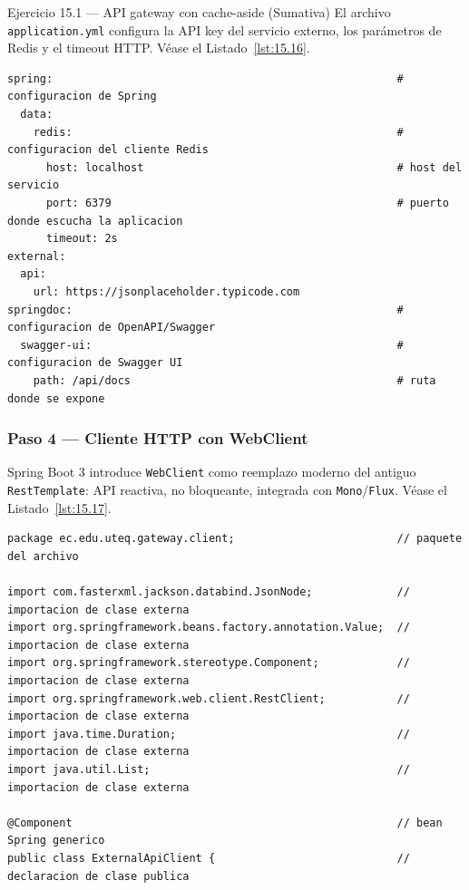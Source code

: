 \documentclass[11pt,a4paper,openany]{book}
\begin{document}
\begin{cajaejercicio}{Ejercicio 15.1 --- API gateway con cache-aside (Sumativa)}
El archivo \texttt{application.yml} configura la API key
del servicio externo, los parámetros de Redis y el timeout HTTP. V\'ease el Listado~\ref{lst:15.16}.


\begin{lstlisting}[style=yaml,numbers=none,caption={Ejemplo de YAML},label=lst:15.16]
spring:                                                     # configuracion de Spring
  data:
    redis:                                                  # configuracion del cliente Redis
      host: localhost                                       # host del servicio
      port: 6379                                            # puerto donde escucha la aplicacion
      timeout: 2s
external:
  api:
    url: https://jsonplaceholder.typicode.com
springdoc:                                                  # configuracion de OpenAPI/Swagger
  swagger-ui:                                               # configuracion de Swagger UI
    path: /api/docs                                         # ruta donde se expone
\end{lstlisting}

\subsubsection*{Paso 4 --- Cliente HTTP con WebClient}

Spring Boot 3 introduce \texttt{WebClient} como reemplazo
moderno del antiguo \texttt{RestTemplate}: API reactiva, no
bloqueante, integrada con \texttt{Mono}/\texttt{Flux}. V\'ease el Listado~\ref{lst:15.17}.


\begin{lstlisting}[style=java,caption={ExternalApiClient.java},label=lst:15.17]
package ec.edu.uteq.gateway.client;                         // paquete del archivo

import com.fasterxml.jackson.databind.JsonNode;             // importacion de clase externa
import org.springframework.beans.factory.annotation.Value;  // importacion de clase externa
import org.springframework.stereotype.Component;            // importacion de clase externa
import org.springframework.web.client.RestClient;           // importacion de clase externa
import java.time.Duration;                                  // importacion de clase externa
import java.util.List;                                      // importacion de clase externa

@Component                                                  // bean Spring generico
public class ExternalApiClient {                            // declaracion de clase publica


\end{lstlisting}
\end{cajaejercicio}
\end{document}
